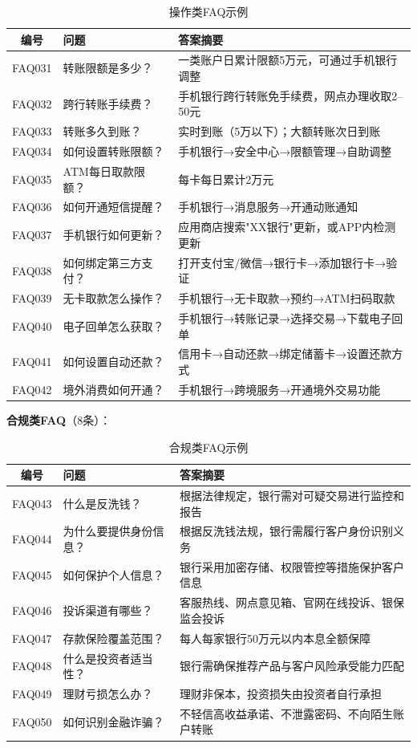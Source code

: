 \begin{table}[H]
\centering
\small
\begin{tabular}{clp{7cm}}
\toprule
\textbf{编号} & \textbf{问题} & \textbf{答案摘要} \\
\midrule
FAQ031 & 转账限额是多少？ & 一类账户日累计限额5万元，可通过手机银行调整 \\
FAQ032 & 跨行转账手续费？ & 手机银行跨行转账免手续费，网点办理收取2--50元 \\
FAQ033 & 转账多久到账？ & 实时到账（5万以下）；大额转账次日到账 \\
FAQ034 & 如何设置转账限额？ & 手机银行→安全中心→限额管理→自助调整 \\
FAQ035 & ATM每日取款限额？ & 每卡每日累计2万元 \\
FAQ036 & 如何开通短信提醒？ & 手机银行→消息服务→开通动账通知 \\
FAQ037 & 手机银行如何更新？ & 应用商店搜索"XX银行"更新，或APP内检测更新 \\
FAQ038 & 如何绑定第三方支付？ & 打开支付宝/微信→银行卡→添加银行卡→验证 \\
FAQ039 & 无卡取款怎么操作？ & 手机银行→无卡取款→预约→ATM扫码取款 \\
FAQ040 & 电子回单怎么获取？ & 手机银行→转账记录→选择交易→下载电子回单 \\
FAQ041 & 如何设置自动还款？ & 信用卡→自动还款→绑定储蓄卡→设置还款方式 \\
FAQ042 & 境外消费如何开通？ & 手机银行→跨境服务→开通境外交易功能 \\
\bottomrule
\end{tabular}
\caption{操作类FAQ示例}
\end{table}

\textbf{合规类FAQ}（8条）：

\begin{table}[H]
\centering
\small
\begin{tabular}{clp{7cm}}
\toprule
\textbf{编号} & \textbf{问题} & \textbf{答案摘要} \\
\midrule
FAQ043 & 什么是反洗钱？ & 根据法律规定，银行需对可疑交易进行监控和报告 \\
FAQ044 & 为什么要提供身份信息？ & 根据反洗钱法规，银行需履行客户身份识别义务 \\
FAQ045 & 如何保护个人信息？ & 银行采用加密存储、权限管控等措施保护客户信息 \\
FAQ046 & 投诉渠道有哪些？ & 客服热线、网点意见箱、官网在线投诉、银保监会投诉 \\
FAQ047 & 存款保险覆盖范围？ & 每人每家银行50万元以内本息全额保障 \\
FAQ048 & 什么是投资者适当性？ & 银行需确保推荐产品与客户风险承受能力匹配 \\
FAQ049 & 理财亏损怎么办？ & 理财非保本，投资损失由投资者自行承担 \\
FAQ050 & 如何识别金融诈骗？ & 不轻信高收益承诺、不泄露密码、不向陌生账户转账 \\
\bottomrule
\end{tabular}
\caption{合规类FAQ示例}
\end{table}

